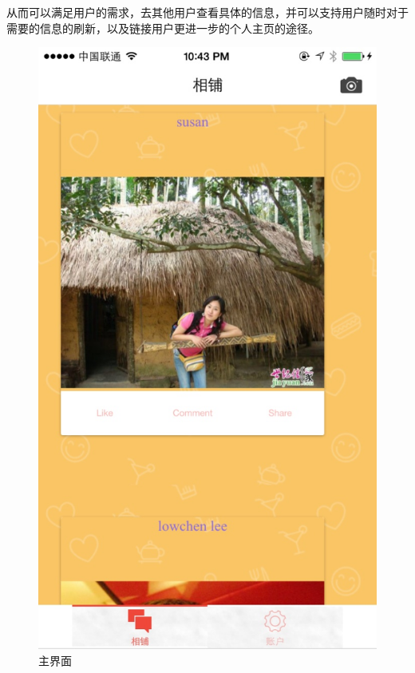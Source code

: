 从而可以满足用户的需求，去其他用户查看具体的信息，并可以支持用户随时对于需要的信息的刷新，以及链接用户更进一步的个人主页的途径。
\begin{figure}[h] 
\begin{minipage}[t]{0.3\linewidth}
\centering
\includegraphics[width=\textwidth]{img/chap4/info1.jpg}
\caption{主界面\label{flickr}}
\end{minipage}
\hfill
\begin{minipage}[t]{0.3\linewidth}
\centering

\end{minipage}
\end{figure}
